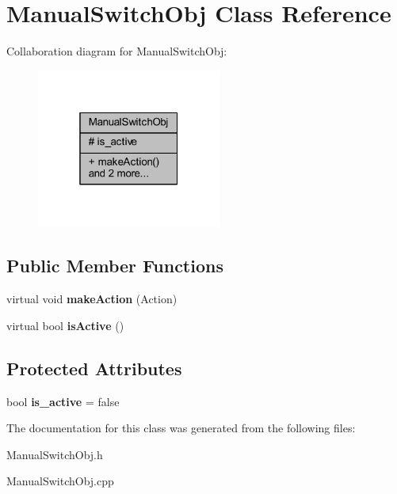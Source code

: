 \hypertarget{class_manual_switch_obj}{}\section{Manual\+Switch\+Obj Class Reference}
\label{class_manual_switch_obj}


Collaboration diagram for Manual\+Switch\+Obj\+:\nopagebreak
\begin{figure}[H]
\begin{center}
\leavevmode
\includegraphics[width=172pt]{class_manual_switch_obj__coll__graph}
\end{center}
\end{figure}
\subsection*{Public Member Functions}
\begin{DoxyCompactItemize}
\item 
\mbox{\label{class_manual_switch_obj_a138301db593d2b231bad0298a38e1680}} 
virtual void {\bfseries make\+Action} (Action)
\item 
\mbox{\label{class_manual_switch_obj_a4d6cc0a3de424ab6bf4665eeb0f639af}} 
virtual bool {\bfseries is\+Active} ()
\end{DoxyCompactItemize}
\subsection*{Protected Attributes}
\begin{DoxyCompactItemize}
\item 
\mbox{\label{class_manual_switch_obj_aa1d16c8a1740f4dc3152470088154f97}} 
bool {\bfseries is\+\_\+active} = false
\end{DoxyCompactItemize}


The documentation for this class was generated from the following files\+:\begin{DoxyCompactItemize}
\item 
Manual\+Switch\+Obj.\+h\item 
Manual\+Switch\+Obj.\+cpp\end{DoxyCompactItemize}

